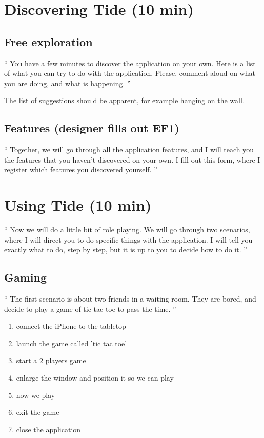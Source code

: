 \section{Discovering Tide (10 min)}

\subsection{Free exploration}
 
``
You have a few minutes to discover the application on your own.
Here is a list of what you can try to do with the application.
Please, comment aloud on what you are doing, and what is happening.
''

The list of suggestions should be apparent, for example hanging on the wall.


\subsection{Features (designer fills out EF1)}

``
Together, we will go through all the application features, and I will teach you the features that you haven't discovered on your own.
I fill out this form, where I register which features you discovered yourself.
''

\section{Using Tide (10 min)}

``
Now we will do a little bit of role playing. We will go through two scenarios, where I will direct you to do specific things with the application.
I will tell you exactly what to do, step by step, but it is up to you to decide how to do it.
''

\subsection{Gaming}

``
The first scenario is about two friends in a waiting room. They are bored, and decide to play a game of tic-tac-toe to pass the time.
''

\begin{enumerate}
\item connect the iPhone to the tabletop
\item launch the game called 'tic tac toe'
\item start a 2 players game
\item enlarge the window and position it so we can play
\item now we play
\item exit the game
\item close the application
\end{enumerate}

